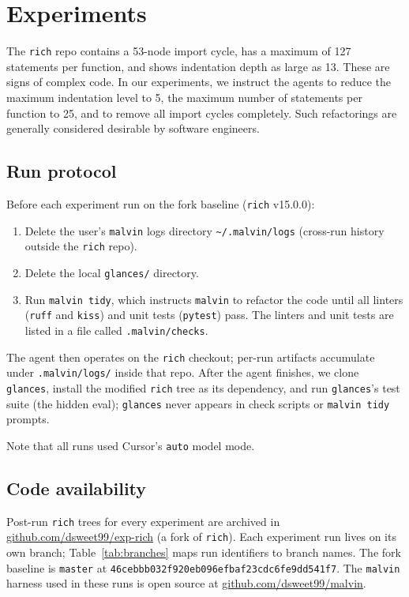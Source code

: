 \documentclass[11pt]{article}
\newcommand{\richrev}{46cebbb032f920eb096efbaf23cdc6fe9dd541f7}
\begin{document}
\section{Experiments}
\label{sec:experiments}

The \texttt{rich} repo contains a 53-node import cycle, has a maximum of 127 statements per function, and 
shows indentation depth as large as 13. These are signs of complex code. In our experiments, we instruct the
agents to reduce the maximum indentation level to 5, the maximum number of statements per function to 25, and to remove
all import cycles completely. Such refactorings are generally considered desirable \cite{meta} by software
engineers.

\subsection{Run protocol}
\label{sec:protocol}

Before each experiment run on the fork baseline (\texttt{rich} v15.0.0):
\begin{enumerate}[nosep]
  \item Delete the user's \texttt{malvin} logs directory \texttt{\textasciitilde/.malvin/logs} (cross-run history outside the \texttt{rich} repo).
  \item Delete the local \texttt{glances/} directory.
  \item Run \texttt{malvin tidy}, which instructs \texttt{malvin} to refactor the code until all
   linters (\texttt{ruff} 
  and \texttt{kiss}) and unit tests (\texttt{pytest}) pass. The linters and unit tests are listed in a file called
  \texttt{.malvin/checks}.
\end{enumerate}
The agent then operates on the \texttt{rich} checkout; per-run artifacts accumulate under \texttt{.malvin/logs/} 
inside that repo. After the agent finishes, we clone \texttt{glances}, install the modified \texttt{rich} tree as its 
dependency, and run {\texttt{glances}}'s test suite (the hidden eval); \texttt{glances} never appears in check scripts or
 \texttt{malvin tidy} prompts.

 Note that all runs used Cursor's \texttt{auto} model mode.

\subsection{Code availability}
\label{sec:code}

Post-run \texttt{rich} trees for every experiment are archived in \url{github.com/dsweet99/exp-rich} (a
 fork of \texttt{rich}). Each experiment run lives on its own branch; Table~\ref{tab:branches} maps run
  identifiers to branch names. The fork baseline is \texttt{master} at \texttt{\richrev}. The \texttt{malvin}
   harness used in these runs is open source at \url{github.com/dsweet99/malvin}.
\end{document}

